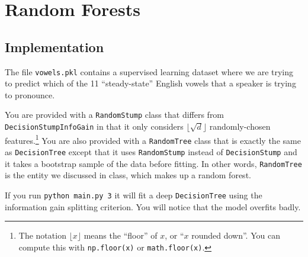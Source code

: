 \documentclass{article}
\begin{document}
\begin{enumerate}
\end{enumerate}

\pagebreak

\section{Random Forests}


 \subsection{Implementation}

The file \texttt{vowels.pkl} contains a supervised learning dataset where we are trying to predict which of the 11 ``steady-state'' English vowels that a speaker is trying to pronounce.

You are provided with a \texttt{RandomStump} class that differs from
\texttt{DecisionStumpInfoGain} in that
it only considers $\lfloor \sqrt{d} \rfloor$ randomly-chosen features.\footnote{The notation $\lfloor x\rfloor$ means the ``floor'' of $x$, or ``$x$ rounded down''. You can compute this with \texttt{np.floor(x)} or \texttt{math.floor(x)}.}
You are also provided with a \texttt{RandomTree} class that is exactly the same as
\texttt{DecisionTree} except that it uses \texttt{RandomStump} instead of
\texttt{DecisionStump} and it takes a bootstrap sample of the data before fitting.
In other words, \texttt{RandomTree} is the entity we discussed in class, which
makes up a random forest.

If you run \texttt{python main.py 3} it will fit a deep \texttt{DecisionTree}
using the information gain splitting criterion. You will notice that the model overfits badly.
\end{document}

